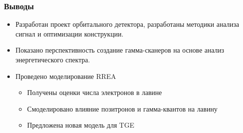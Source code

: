 %
\begin{frame}
    \frametitle{Выводы}
    \begin{itemize}
        \item Разработан проект орбитального детектора, разработаны методики анализа сигнал и оптимизации конструкции. 
        \item Показано перспективность создание гамма-сканеров на основе анализ энергетического спектра.
        \item Проведено моделирование RREA
            \begin{itemize}
                \item Получены оценки числа электронов в лавине
                \item Смоделировано влияние позитронов и гамма-квантов на лавину
                \item Предложена новая модель для TGE
            \end{itemize}
    \end{itemize}
\end{frame}
